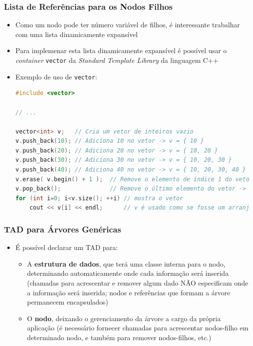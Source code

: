 \documentclass[aspectratio=169]{beamer}
\begin{document}
\begin{frame}[fragile]\frametitle{Lista de Referências para os Nodos Filhos}
\begin{itemize}
	\item Como um nodo pode ter número variável de filhos, é interessante trabalhar com uma lista dinamicamente expansível
	\item Para implemenar esta lista dinamicamente expansível é possível usar o \emph{container} \texttt{vector} da \emph{Standard Template Library} da linguagem C++
	\item Exemplo de uso de \texttt{vector}:
\begin{lstlisting}[language=C++,basicstyle=\ttfamily\tiny]
#include <vector>

// ...

vector<int> v;   // Cria um vetor de inteiros vazio
v.push_back(10); // Adiciona 10 no vetor -> v = { 10 }
v.push_back(20); // Adiciona 20 no vetor -> v = { 10, 20 }
v.push_back(30); // Adiciona 30 no vetor -> v = { 10, 20, 30 }
v.push_back(40); // Adiciona 40 no vetor -> v = { 10, 20, 30, 40 }
v.erase( v.begin() + 1 );  // Remove o elemento de índice 1 do vetor -> v = { 10, 30, 40 }
v.pop_back();              // Remove o último elemento do vetor -> v = { 10, 30 }
for (int i=0; i<v.size(); ++i) // mostra o vetor
    cout << v[i] << endl;      // v é usado como se fosse um arranjo
\end{lstlisting}
\end{itemize}
\end{frame}

\begin{frame}\frametitle{TAD para Árvores Genéricas}
\begin{itemize}
	\item É possível declarar um TAD para:
	\begin{itemize}
		\item A \textbf{estrutura de dados}, que terá uma classe interna para o nodo, determinando automaticamente onde cada informação será inserida (chamadas para acrescentar e remover algum dado NÃO especificam onde a informação será inserida; nodos e referências que formam a árvore permanecem encapsulados)
		\item O \textbf{nodo}, deixando o gerenciamento da árvore a cargo da própria aplicação (é necessário fornecer chamadas para acrescentar nodos-filho em determinado nodo, e também para remover nodos-filhos, etc.)
	\end{itemize}
\end{itemize}
\end{frame}
\end{document}
